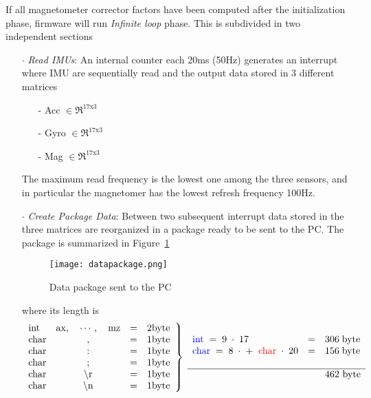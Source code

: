 If all magnetometer corrector factors have been computed after the initialization phase, firmware will run \textit{Infinite loop} phase. This is subdivided in two independent sections
\begin{enumerate}
\item[$\cdot$] \textit{Read IMUs}: An internal counter each $20$ms (50Hz) generates an interrupt where IMU are sequentially read and the output data stored in 3 different matrices
                          \begin{enumerate}
                          \item[-] Acc $\in \Re ^{17 \text{x} 3}$
                          \item[-] Gyro $\in \Re ^{17 \text{x} 3}$
                          \item[-] Mag $\in \Re ^{17 \text{x} 3}$
                          \end{enumerate}
                          The maximum read frequency is the lowest one among the three sensors, and in particular the magnetomer has the lowest refresh frequency 100Hz.
\item[$\cdot$] \textit{Create Package Data}:  Between two subsequent interrupt data stored in the three matrices are reorganized in a package ready to be sent to the PC. The package  is summarized in Figure~\ref{fig:package}
\begin{figure}[h]
\centering
\texttt{[image: datapackage.png]}
\caption{Data package sent to  the PC}
\label{fig:package}
\end{figure}

\noindent where its length is
\begin{equation*}
\displaystyle  \left. \begin{array}{lccc}
\text{int} & \text{ax},\quad \cdots, \quad \text{mz}  & = & 2 \text{byte} \\
\text{char} & , & = & 1 \text{byte} \\
\text{char} & : & = & 1 \text{byte} \\
\text{char} & ; & = & 1 \text{byte} \\
\text{char} & \backslash \text{r} & = & 1 \text{byte} \\
\text{char} & \backslash \text{n} & = & 1 \text{byte}
\end{array} \right\rbrace \;
\begin{array}{lcl}
\textcolor{blue}{\text{int}} \; = \; 9 \; \cdot \; 17 \; & = & 306 \; \text{byte} \\
\textcolor{blue}{\text{char}} \; = \; 8  \; \cdot \;+\; \; \textcolor{red}{\text{char}} \; \cdot \; 20  & = & 156 \; \text{byte}  \\
& & \\ \hline
 & & \text{462 byte}
\end{array}
\end{equation*}


\end{enumerate}

